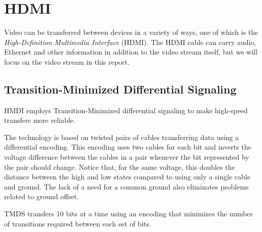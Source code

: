 \section{HDMI}
Video can be transferred between devices in a variety of ways, one of which is the \textit{High-Definition Multimedia Interface} (HDMI).
The HDMI cable can carry audio, Ethernet and other information in addition to the video stream itself, but we will focus on the video stream in this report.

\subsection{Transition-Minimized Differential Signaling}
HMDI employs Transition-Minimized differential signaling to make high-speed transfers more reliable.

The technology is based on twisted pairs of cables transferring data using a differential encoding.
This encoding uses two cables for each bit and inverts the voltage difference between the cables in a pair whenever the bit represented by the pair should change.
Notice that, for the same voltage, this doubles the distance between the high and low states compared to using only a single cable and ground.
The lack of a need for a common ground also eliminates problems related to ground offset.

TMDS transfers 10 bits at a time using an encoding that minimizes the number of transitions required between each set of bits.
